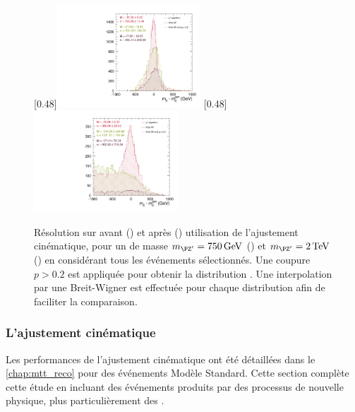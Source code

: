 \begin{figure}[tbp] \centering
    \subcaptionbox{\label{fig:kf_zp_750}}[0.48\textwidth]{\includegraphics[width=0.48\textwidth,angle=-90,origin=c]{chapitre7/figs/kinfit/mtt_resolution_comparison_kf_zp750_all_events.pdf}} \hfill
    \subcaptionbox{\label{fig:kf_zp_2000}}[0.48\textwidth]{\includegraphics[width=0.48\textwidth,angle=-90,origin=c]{chapitre7/figs/kinfit/mtt_resolution_comparison_kf_zp2000_all_events.pdf}}
    \caption{Résolution sur \mtt avant (\rouge) et après (\vertc) utilisation de l'ajustement cinématique, pour un \zprime de masse $\mzp = \SI{750}{\GeV}$ () et $\mzp = \SI{2}{\TeV}$ () en considérant tous les événements sélectionnés. Une coupure $p > \num{0.2}$ est appliquée pour obtenir la distribution \violette. Une interpolation par une Breit-Wigner est effectuée pour chaque distribution afin de faciliter la comparaison.}
    \label{fig:kf_zp}
\end{figure}

\subsubsection{L'ajustement cinématique} \label{sec:zprime_kf}

Les performances de l'ajustement cinématique ont été détaillées dans le \cref{chap:mtt_reco} pour des événements \ttbar Modèle Standard. Cette section complète cette étude en incluant des événements \ttbar produits par des processus de nouvelle physique, plus particulièrement des \zprime.

\medskip

